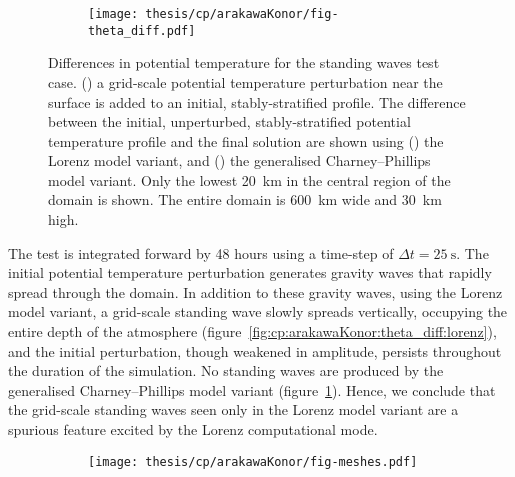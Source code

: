 \begin{figure}
	\centering
	\begin{subfigure}{\textwidth}
		\label{fig:cp:arakawaKonor:theta_diff:initial}
		\label{fig:cp:arakawaKonor:theta_diff:lorenz}
		\label{fig:cp:arakawaKonor:theta_diff:cp}
		\texttt{[image: thesis/cp/arakawaKonor/fig-theta\_diff.pdf]}
	\end{subfigure}
%
	\caption{Differences in potential temperature for the standing waves test case.
	() a grid-scale potential temperature perturbation near the surface is added to an initial, stably-stratified profile.
The difference between the initial, unperturbed, stably-stratified potential temperature profile and the final solution are shown using
	() the Lorenz model variant, and 
	() the generalised Charney--Phillips model variant.
Only the lowest \SI{20}{\kilo\meter} in the central region of the domain is shown.  The entire domain is \SI{600}{\kilo\meter} wide and \SI{30}{\kilo\meter} high.
	}
	\label{fig:cp:arakawaKonor:theta_diff}
\end{figure}

The test is integrated forward by 48 hours using a time-step of $\Delta t = \SI{25}{\second}$.
The initial potential temperature perturbation generates gravity waves that rapidly spread through the domain.
In addition to these gravity waves, using the Lorenz model variant, a grid-scale standing wave slowly spreads vertically, occupying the entire depth of the atmosphere (figure~\ref{fig:cp:arakawaKonor:theta_diff:lorenz}), and the initial perturbation, though weakened in amplitude, persists throughout the duration of the simulation.
No standing waves are produced by the generalised Charney--Phillips model variant (figure~\ref{fig:cp:arakawaKonor:theta_diff:cp}).
Hence, we conclude that the grid-scale standing waves seen only in the Lorenz model variant are a spurious feature excited by the Lorenz computational mode.

\begin{figure}
	\centering
	\begin{subfigure}{\textwidth}
		\label{fig:cp:arakawaKonor:edgeGradedMesh:h}
		\label{fig:cp:arakawaKonor:edgeGradedMesh:v}
		\texttt{[image: thesis/cp/arakawaKonor/fig-meshes.pdf]}
	\end{subfigure}
%
	\caption{}
	\label{fig:cp:arakawaKonor:edgeGradedMesh}
\end{figure}


\blindtext
